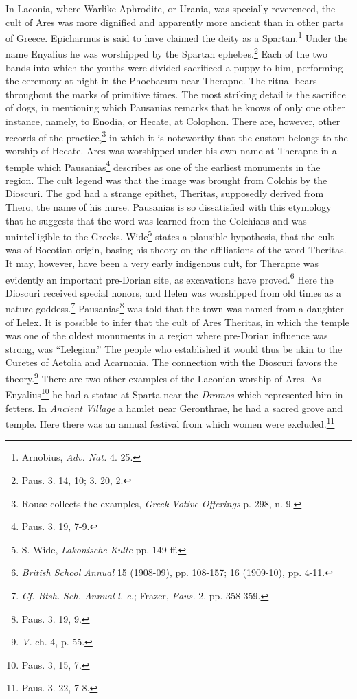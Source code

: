 \documentclass[a4paper, 12pt, oneside]{article}
\begin{document}
In Laconia, where Warlike Aphrodite, or Urania, was specially reverenced, the cult of Ares was more dignified and apparently more ancient than in other parts of Greece. Epicharmus is said to have claimed the deity as a Spartan.\footnote{Arnobius, \emph{Adv. Nat.} 4. 25.} Under the name Enyalius he was worshipped by the Spartan ephebes.\footnote{Paus. 3. 14, 10; 3. 20, 2.} Each of the two bands into which the youths were divided sacrificed a puppy to him, performing the ceremony at night in the Phoebaeum near Therapne. The ritual bears throughout the marks of primitive times. The most striking detail is the sacrifice of dogs, in mentioning which Pausanias remarks that he knows of only one other instance, namely, to Enodia, or Hecate, at Colophon. There are, however, other records of the practice,\footnote{Rouse collects the examples, \emph{Greek Votive Offerings} p. 298, n. 9.} in which it is noteworthy that the custom belongs to the worship of Hecate. Ares was worshipped under his own name at Therapne in a temple which Pausanias\footnote{Paus. 3. 19, 7-9.} describes as one of the earliest monuments in the region. The cult legend was that the image was brought from Colchis by the Dioscuri. The god had a strange epithet, Theritas, supposedly derived from Thero, the name of his nurse. Pausanias is so dissatisfied with this etymology that he suggests that the word was learned from the Colchians and was unintelligible to the Greeks. Wide\footnote{S. Wide, \emph{Lakonische Kulte} pp. 149 ff.} states a plausible hypothesis, that the cult was of Boeotian origin, basing his theory on the affiliations of the word Theritas. It may, however, have been a very early indigenous cult, for Therapne was evidently an important pre-Dorian site, as excavations have proved.\footnote{\emph{British School Annual} 15 (1908-09), pp. 108-157; 16 (1909-10), pp. 4-11.} Here the Dioscuri received special honors, and Helen was worshipped from old times as a nature goddess.\footnote{\emph{Cf. Btsh. Sch. Annual} \emph{l. c.}; Frazer, \emph{Paus.} 2. pp. 358-359.} Pausanias\footnote{Paus. 3. 19, 9.} was told that the town was named from a daughter of Lelex. It is possible to infer that the cult of Ares Theritas, in which the temple was one of the oldest monuments in a region where pre-Dorian influence was strong, was ``Lelegian.'' The people who established it would thus be akin to the Curetes of Aetolia and Acarnania. The connection with the Dioscuri favors the theory.\footnote{\emph{V.} ch. 4, p. 55.} There are two other examples of the Laconian worship of Ares. As Enyalius\footnote{Paus. 3, 15, 7.} he had a statue at Sparta near the \emph{Dromos} which represented him in fetters. In \emph{Ancient Village} a hamlet near Geronthrae, he had a sacred grove and temple. Here there was an annual festival from which women were excluded.\footnote{Paus. 3. 22, 7-8.}
\end{document}
